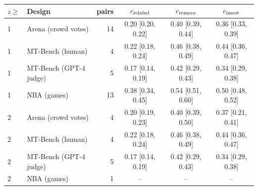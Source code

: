 \begin{tabular}{llrccc}\toprule
$z\geq$ & Design & pairs & $c_{\rm relabel}$ & $c_{\rm remove}$ & $c_{\rm insert}$ \\\midrule
1 & Arena (crowd votes) & 14 & 0.20 [0.20, 0.22] & 0.40 [0.39, 0.44] & 0.36 [0.33, 0.39] \\
1 & MT-Bench (human) & 4 & 0.22 [0.18, 0.24] & 0.46 [0.38, 0.49] & 0.44 [0.36, 0.47] \\
1 & MT-Bench (GPT-4 judge) & 5 & 0.17 [0.14, 0.19] & 0.42 [0.29, 0.43] & 0.34 [0.29, 0.38] \\
1 & NBA (games) & 13 & 0.38 [0.34, 0.45] & 0.54 [0.51, 0.60] & 0.50 [0.48, 0.52] \\
2 & Arena (crowd votes) & 4 & 0.20 [0.19, 0.23] & 0.40 [0.39, 0.50] & 0.37 [0.21, 0.41] \\
2 & MT-Bench (human) & 4 & 0.22 [0.18, 0.24] & 0.46 [0.38, 0.49] & 0.44 [0.36, 0.47] \\
2 & MT-Bench (GPT-4 judge) & 5 & 0.17 [0.14, 0.19] & 0.42 [0.29, 0.43] & 0.34 [0.29, 0.38] \\
2 & NBA (games) & 1 & -- & -- & -- \\
\bottomrule\end{tabular}
